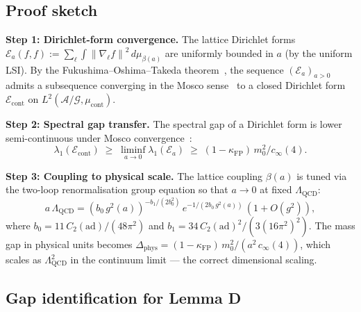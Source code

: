 \documentclass[11pt,a4paper]{amsart}
\theoremstyle{definition}
\theoremstyle{remark}
\newcommand{\calA}{\mathcal{A}}
\newcommand{\calG}{\mathcal{G}}
\newcommand{\calE}{\mathcal{E}}
\newcommand{\norm}[1]{\left\lVert#1\right\rVert}
\newcommand{\ad}{\mathrm{ad}}
\newcommand{\kFP}{\kappa_{\mathrm{FP}}}
\newcommand{\cinf}{c_{\infty}}
\begin{document}
\subsection{Proof sketch}

\noindent
\textbf{Step 1: Dirichlet-form convergence.}
The lattice Dirichlet forms
$\calE_a(f, f) := \sum_\ell \int \norm{\nabla_\ell f}^2\,d\mu_{\beta(a)}$
are uniformly bounded in $a$ (by the uniform LSI). By the
Fukushima--Oshima--Takeda theorem~\cite{FOT1994}, the sequence
$(\calE_a)_{a > 0}$ admits a subsequence converging in the Mosco
sense~\cite{Mosco1994} to a closed Dirichlet form $\calE_{\mathrm{cont}}$
on $L^2(\calA/\calG, \mu_{\mathrm{cont}})$.

\medskip
\noindent
\textbf{Step 2: Spectral gap transfer.}
The spectral gap of a Dirichlet form is lower semi-continuous under
Mosco convergence~\cite{KuwaeShioya2003}:
\[
\lambda_1(\calE_{\mathrm{cont}}) \;\geq\; \liminf_{a \to 0}
\lambda_1(\calE_a) \;\geq\; (1-\kFP)\,m_0^2/\cinf(4).
\]

\noindent
\textbf{Step 3: Coupling to physical scale.}
The lattice coupling $\beta(a)$ is tuned via the two-loop renormalisation
group equation so that $a \to 0$ at fixed $\Lambda_{\mathrm{QCD}}$:
\[
a\,\Lambda_{\mathrm{QCD}} = (b_0\,g^2(a))^{-b_1/(2b_0^2)}\,
e^{-1/(2b_0\,g^2(a))}\,(1 + O(g^2)),
\]
where $b_0 = 11\,C_2(\ad)/(48\pi^2)$ and $b_1 = 34\,C_2(\ad)^2/(3(16\pi^2)^2)$.
The mass gap in physical units becomes
$\Delta_{\mathrm{phys}} = (1-\kFP)\,m_0^2/(a^2\,\cinf(4))$, which
scales as $\Lambda_{\mathrm{QCD}}^2$ in the continuum limit --- the
correct dimensional scaling.

\subsection{Gap identification for Lemma D}
\end{document}
